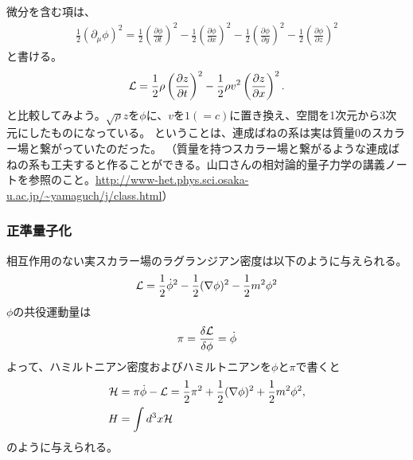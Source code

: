\documentclass[10pt,a4paper]{jarticle}
\begin{document}
微分を含む項は、
\begin{align}
\frac{1}{2}(\partial_\mu \phi)^2
=
\frac{1}{2}\left( \frac{\partial\phi}{\partial t} \right)^2
- \frac{1}{2}\left( \frac{\partial\phi}{\partial x} \right)^2
- \frac{1}{2}\left( \frac{\partial\phi}{\partial y} \right)^2
- \frac{1}{2}\left( \frac{\partial\phi}{\partial z} \right)^2
\end{align}
と書ける。
\begin{align}
{\cal L} =
 \frac{1}{2} \rho \left( \frac{\partial z}{\partial t} \right)^2
 -  \frac{1}{2} \rho v^2 \left( \frac{\partial z}{\partial x} \right)^2.
\end{align}
と比較してみよう。$\sqrt{\rho} z$を$\phi$に、$v$を$1 (=c)$に置き換え、空間を1次元から3次元にしたものになっている。
ということは、連成ばねの系は実は質量0のスカラー場と繋がっていたのだった。
（質量を持つスカラー場と繋がるような連成ばねの系も工夫すると作ることができる。山口さんの相対論的量子力学の講義ノートを参照のこと。\url{http://www-het.phys.sci.osaka-u.ac.jp/~yamaguch/j/class.html}）

%

\subsubsection{正準量子化}
相互作用のない実スカラー場のラグランジアン密度は以下のように与えられる。
\begin{align}
{\cal L} = \frac{1}{2} \dot\phi^2 - \frac{1}{2} (\nabla \phi)^2 - \frac{1}{2}m^2 \phi^2
\end{align}
%
$\phi$の共役運動量は
\begin{align}
\pi = \frac{\delta {\cal L}}{\delta \phi} = \dot\phi
\end{align}
よって、ハミルトニアン密度およびハミルトニアンを$\phi$と$\pi$で書くと
\begin{align}
{\cal H} &= \pi \dot\phi - {\cal L} = \frac{1}{2}\pi^2 + \frac{1}{2}(\nabla\phi)^2 + \frac{1}{2}m^2 \phi^2, \\
H &= \int d^3x {\cal H}
\end{align}
のように与えられる。
\end{document}
